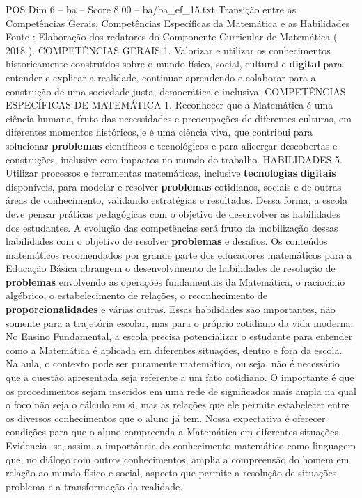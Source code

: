 \begin{textsample}{POS Dim 6 – ba – Score 8.00 – ba/ba\_ef\_15.txt}
Transição entre as Competências Gerais, Competências Específicas da Matemática e as Habilidades Fonte : Elaboração dos redatores do Componente Curricular de Matemática ( 2018 ).
COMPETÊNCIAS GERAIS 1.
Valorizar e utilizar os conhecimentos historicamente construídos sobre o mundo físico, social, cultural e \textbf{digital} para entender e explicar a realidade, continuar aprendendo e colaborar para a construção de uma sociedade justa, democrática e inclusiva.
COMPETÊNCIAS ESPECÍFICAS DE MATEMÁTICA 1.
Reconhecer que a Matemática é uma ciência humana, fruto das necessidades e preocupações de diferentes culturas, em diferentes momentos históricos, e é uma ciência viva, que contribui para solucionar \textbf{problemas} científicos e tecnológicos e para alicerçar descobertas e construções, inclusive com impactos no mundo do trabalho.
HABILIDADES 5.
Utilizar processos e ferramentas matemáticas, inclusive \textbf{tecnologias} \textbf{digitais} disponíveis, para modelar e resolver \textbf{problemas} cotidianos, sociais e de outras áreas de conhecimento, validando estratégias e resultados.
Dessa forma, a escola deve pensar práticas pedagógicas com o objetivo de desenvolver as habilidades dos estudantes.
A evolução das competências será fruto da mobilização dessas habilidades com o objetivo de resolver \textbf{problemas} e desafios.
Os conteúdos matemáticos recomendados por grande parte dos educadores matemáticos para a Educação Básica abrangem o desenvolvimento de habilidades de resolução de \textbf{problemas} envolvendo as operações fundamentais da Matemática, o raciocínio algébrico, o estabelecimento de relações, o reconhecimento de \textbf{proporcionalidades} e várias outras.
Essas habilidades são importantes, não somente para a trajetória escolar, mas para o próprio cotidiano da vida moderna.
No Ensino Fundamental, a escola precisa potencializar o estudante para entender como a Matemática é aplicada em diferentes situações, dentro e fora da escola.
Na aula, o contexto pode ser puramente matemático, ou seja, não é necessário que a questão apresentada seja referente a um fato cotidiano.
O importante é que os procedimentos sejam inseridos em uma rede de significados mais ampla na qual o foco não seja o cálculo em si, mas as relações que ele permite estabelecer entre os diversos conhecimentos que o aluno já tem.
Nossa expectativa é oferecer condições para que o aluno compreenda a Matemática em diferentes situações.
Evidencia -se, assim, a importância do conhecimento matemático como linguagem que, no diálogo com outros conhecimentos, amplia a compreensão do homem em relação ao mundo físico e social, aspecto que permite a resolução de situações-problema e a transformação da realidade.

\end{textsample}
